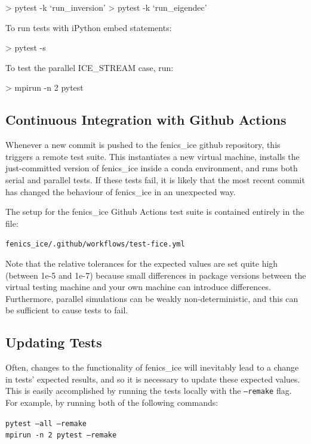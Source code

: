 \documentclass[11pt, reqno, nocenter]{article}
\begin{document}
\begin{spverbatim}
> pytest -k `run_inversion'
> pytest -k `run_eigendec'
\end{spverbatim}

To run tests with iPython embed statements:
\begin{spverbatim}
> pytest -s
\end{spverbatim}

To test the parallel ICE\_STREAM case, run:
\begin{spverbatim}
> mpirun -n 2 pytest
\end{spverbatim}

\subsection{Continuous Integration with Github Actions}

Whenever a new commit is pushed to the fenics\_ice github repository, this triggers a remote test suite. This instantiates a new virtual machine, installs the just-committed version of fenics\_ice inside a conda environment, and runs both serial and parallel tests. If these tests fail, it is likely that the most recent commit has changed the behaviour of fenics\_ice in an unexpected way.

The setup for the fenics\_ice Github Actions test suite is contained entirely in the file:

\texttt{fenics\_ice/.github/workflows/test-fice.yml}

Note that the relative tolerances for the expected values are set quite high (between 1e-5 and 1e-7) because small differences in package versions between the virtual testing machine and your own machine can introduce differences. Furthermore, parallel simulations can be weakly non-deterministic, and this can be sufficient to cause tests to fail.

\subsection{Updating Tests}

Often, changes to the functionality of fenics\_ice will inevitably lead to a change in tests' expected results, and so it is necessary to update these expected values. This is easily accomplished by running the tests locally with the \texttt{--remake} flag. For example, by running both of the following commands:

\texttt{pytest --all --remake}\\
\texttt{mpirun -n 2 pytest --remake}\\
\end{document}
